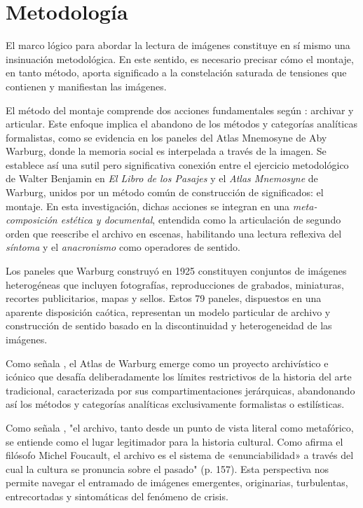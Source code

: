 \section{Metodología}

El marco lógico para abordar la lectura de imágenes constituye en sí mismo una insinuación metodológica. En este sentido, es necesario precisar cómo el montaje, en tanto método, aporta significado a la constelación saturada de tensiones que contienen y manifiestan las imágenes.

El método del montaje comprende dos acciones fundamentales según \parencite{Guasch2005}: archivar y articular. Este enfoque implica el abandono de los métodos y categorías analíticas formalistas, como se evidencia en los paneles del Atlas Mnemosyne de Aby Warburg, donde la memoria social es interpelada a través de la imagen. Se establece así una sutil pero significativa conexión entre el ejercicio metodológico de Walter Benjamin en \textit{El Libro de los Pasajes} y el \textit{Atlas Mnemosyne} de Warburg, unidos por un método común de construcción de significados: el montaje. \textcolor{edit30sept}{En esta investigación, dichas acciones se integran en una \textit{meta-composición estética y documental}, entendida como la articulación de segundo orden que reescribe el archivo en escenas, habilitando una lectura reflexiva del \textit{síntoma} y el \textit{anacronismo} como operadores de sentido.}

Los paneles que Warburg construyó en 1925 constituyen conjuntos de imágenes heterogéneas que incluyen fotografías, reproducciones de grabados, miniaturas, recortes publicitarios, mapas y sellos. Estos 79 paneles, dispuestos en una aparente disposición caótica, representan un modelo particular de archivo y construcción de sentido basado en la discontinuidad y heterogeneidad de las imágenes.

Como señala \parencite{Guasch2011}, el Atlas de Warburg emerge como un proyecto archivístico e icónico que desafía deliberadamente los límites restrictivos de la historia del arte tradicional, caracterizada por sus compartimentaciones jerárquicas, abandonando así los métodos y categorías analíticas exclusivamente formalistas o estilísticas.

Como señala \parencite{Guasch2005}, "el archivo, tanto desde un punto de vista literal como metafórico, se entiende como el lugar legitimador para la historia cultural. Como afirma el filósofo Michel Foucault, el archivo es el sistema de «enunciabilidad» a través del cual la cultura se pronuncia sobre el pasado" (p. 157). Esta perspectiva nos permite navegar el entramado de imágenes emergentes, originarias, turbulentas, entrecortadas y sintomáticas del fenómeno de crisis.

